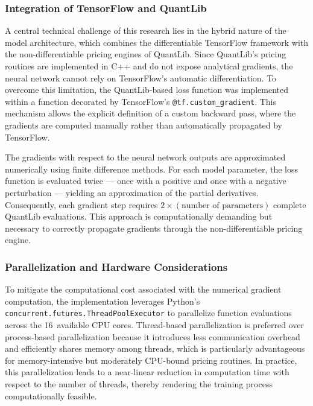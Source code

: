 {\subsubsection{Integration of TensorFlow and QuantLib}
A central technical challenge of this research lies in the hybrid nature of the model architecture, which combines the differentiable TensorFlow framework with the non-differentiable pricing engines of QuantLib. Since QuantLib’s pricing routines are implemented in C++ and do not expose analytical gradients, the neural network cannot rely on TensorFlow’s automatic differentiation. To overcome this limitation, the QuantLib-based loss function was implemented within a function decorated by TensorFlow’s \texttt{@tf.custom\_gradient}. This mechanism allows the explicit definition of a custom backward pass, where the gradients are computed manually rather than automatically propagated by TensorFlow.

The gradients with respect to the neural network outputs are approximated numerically using finite difference methods. For each model parameter, the loss function is evaluated twice — once with a positive and once with a negative perturbation — yielding an approximation of the partial derivatives. Consequently, each gradient step requires $2 \times (\text{number of parameters})$ complete QuantLib evaluations. This approach is computationally demanding but necessary to correctly propagate gradients through the non-differentiable pricing engine.

\subsubsection{Parallelization and Hardware Considerations}
To mitigate the computational cost associated with the numerical gradient computation, the implementation leverages Python’s \texttt{concurrent.futures.ThreadPoolExecutor} to parallelize function evaluations across the 16~available CPU cores. Thread-based parallelization is preferred over process-based parallelization because it introduces less communication overhead and efficiently shares memory among threads, which is particularly advantageous for memory-intensive but moderately CPU-bound pricing routines. In practice, this parallelization leads to a near-linear reduction in computation time with respect to the number of threads, thereby rendering the training process computationally feasible.

}
